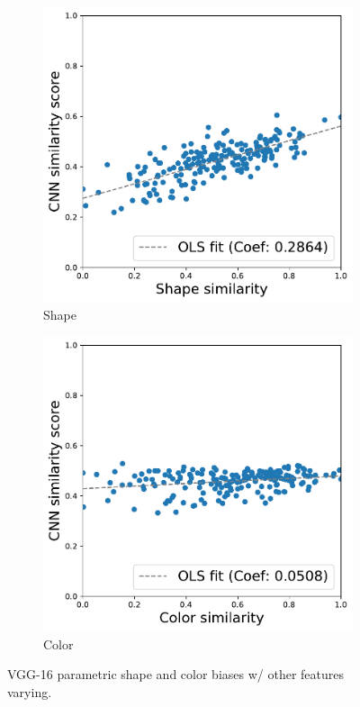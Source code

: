 \begin{figure}[h!]
    \begin{center}
        \begin{subfigure}[b]{0.235\textwidth}
            \includegraphics[width=\linewidth]{figures/vgg_shape_parametric.pdf}
            \caption{Shape}
        \end{subfigure}
        \begin{subfigure}[b]{0.235\textwidth}
            \includegraphics[width=\linewidth]{figures/vgg_color_parametric.pdf}
            \caption{Color}
        \end{subfigure}
    \end{center}
    \caption{VGG-16 parametric shape and color biases w/ other features varying.}
    \label{fig:parametric_others_varying}
\end{figure}